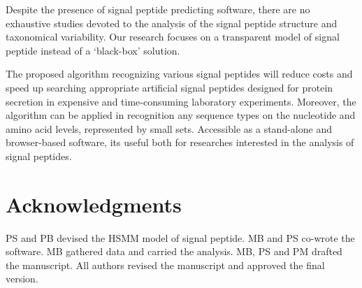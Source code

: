 \documentclass[fleqn,10pt,twoside]{gcb15submission}
\begin{document}
Despite the presence of signal peptide predicting software, there are no exhaustive studies devoted to the analysis of the signal peptide structure and taxonomical variability. Our research focuses on a transparent model of signal peptide instead of a ‘black-box’ solution.

The proposed algorithm recognizing various signal peptides will reduce costs and speed up searching appropriate artificial signal peptides designed for protein secretion in expensive and time-consuming laboratory experiments. Moreover, the algorithm can be applied in recognition any sequence types on the nucleotide and amino acid levels, represented by small sets. Accessible as a stand-alone and browser-based software, its useful both for researches interested in the analysis of signal peptides.


\section*{Acknowledgments}
PS and PB devised the HSMM model of signal peptide. MB and PS co-wrote the software. MB gathered data and carried the analysis.
MB, PS and PM drafted the manuscript. All authors revised the manuscript and approved the final version.



\end{document}
